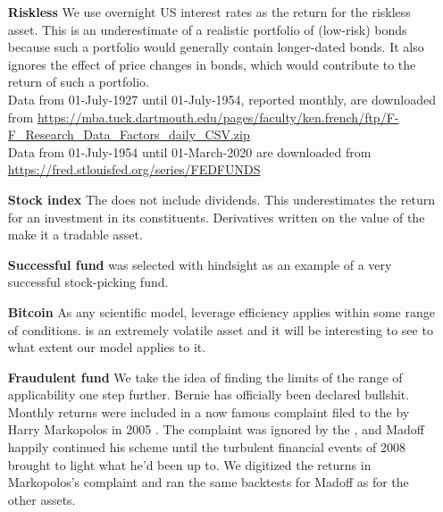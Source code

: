 \begin{itemize}
\item[\bf Riskless] 
We use \FED overnight US interest rates as the return for the riskless asset.
This is an underestimate of a realistic portfolio of (low-risk) bonds because such a portfolio would generally contain longer-dated bonds. It also ignores the effect of price changes in bonds, which would contribute to the return of such a portfolio.\\
Data from  01-July-1927 until 01-July-1954, reported monthly, are downloaded from \url{https://mba.tuck.dartmouth.edu/pages/faculty/ken.french/ftp/F-F_Research_Data_Factors_daily_CSV.zip}\\ 
Data from 01-July-1954 until 01-March-2020 are downloaded from \url{https://fred.stlouisfed.org/series/FEDFUNDS}
\item[\bf Stock index]
The \SP does not include dividends. This underestimates the return for an investment in its constituents. Derivatives written on the value of the \SP make it a tradable asset.
\item[\bf Successful fund]
\BRK was selected with hindsight as an example of a very successful stock-picking fund.  
\item[\bf Bitcoin]
As any scientific model, leverage efficiency applies within some range of conditions. \BTC is an extremely volatile asset and it will be interesting to see to what extent our model applies to it.  
\item[\bf Fraudulent fund]
We take the idea of finding the limits of the range of applicability one step further. Bernie \MAD has officially been declared bullshit. Monthly returns were included in a now famous complaint filed to the \SEC by Harry Markopolos in 2005 \cite{Markopolos2005}. The complaint was ignored by the \SEC, and Madoff happily continued his scheme until the turbulent financial events of 2008 brought to light what he'd been up to. We digitized the returns in Markopolos's complaint and ran the same backtests for Madoff as for the other assets.
\end{itemize}

